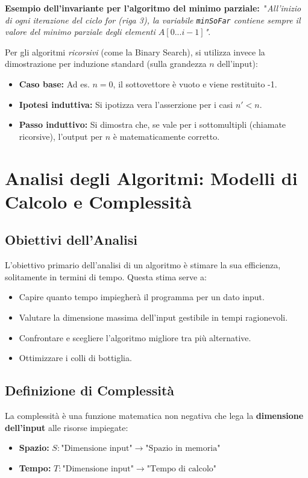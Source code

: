 \documentclass[12pt, a4paper]{article}
\begin{document}
\textbf{Esempio dell'invariante per l'algoritmo del minimo parziale:}\
"\textit{All'inizio di ogni iterazione del ciclo for (riga 3), la variabile \texttt{minSoFar} contiene sempre il valore del minimo parziale degli elementi $A[0...i-1]$"}.

Per gli algoritmi \textit{ricorsivi} (come la Binary Search), si utilizza invece la dimostrazione per induzione standard (sulla grandezza $n$ dell'input):
\begin{itemize}
\item \textbf{Caso base:} Ad es. $n=0$, il sottovettore è vuoto e viene restituito -1.
\item \textbf{Ipotesi induttiva:} Si ipotizza vera l'asserzione per i casi $n' < n$.
\item \textbf{Passo induttivo:} Si dimostra che, se vale per i sottomultipli (chiamate ricorsive), l'output per $n$ è matematicamente corretto.
\end{itemize}



\section{Analisi degli Algoritmi: Modelli di Calcolo e Complessità}

\subsection{Obiettivi dell'Analisi}
L'obiettivo primario dell'analisi di un algoritmo è stimare la sua efficienza, solitamente in termini di tempo. Questa stima serve a:
\begin{itemize}
\item Capire quanto tempo impiegherà il programma per un dato input.
\item Valutare la dimensione massima dell'input gestibile in tempi ragionevoli.
\item Confrontare e scegliere l'algoritmo migliore tra più alternative.
\item Ottimizzare i colli di bottiglia.
\end{itemize}

\subsection{Definizione di Complessità}
La complessità è una funzione matematica non negativa che lega la \textbf{dimensione dell'input} alle risorse impiegate:
\begin{itemize}
\item \textbf{Spazio:} $S: \text{"Dimensione input"} \rightarrow \text{"Spazio in memoria"}$
\item \textbf{Tempo:} $T: \text{"Dimensione input"} \rightarrow \text{"Tempo di calcolo"}$
\end{itemize}
\end{document}
